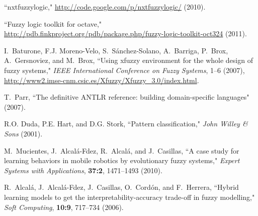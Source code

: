 \documentclass[11pt,twoside]{article}
\begin{document}
\begin{multicols}{2}
\begin{thebibliography}{10}
``nxtfuzzylogic," \url{http://code.google.com/p/nxtfuzzylogic/} (2010).

``Fuzzy logic toolkit for octave,"
\newblock
  \url{http://pdb.finkproject.org/pdb/package.php/fuzzy-logic-toolkit-oct324} (2011).

I.~Baturone, F.J. Moreno-Velo, S.~S\'anchez-Solano, A.~Barriga, P.~Brox,
  A.~Gersnoviez, and M.~Brox,
\newblock ``Using xfuzzy environment for the whole design of fuzzy systems," {\it IEEE International Conference on Fuzzy Systems}, 1--6 (2007), \url{http://www2.imse-cnm.csic.es/Xfuzzy/Xfuzzy_3.0/index.html}.

T.~Parr, ``The definitive ANTLR reference: building domain-specific languages" (2007).

{R.O.} Duda, {P.E.} Hart, and {D.G.} Stork,
\newblock ``Pattern classification," {\it John Willey \& Sons} (2001).

M.~Mucientes, J.~Alcal\'a-Fdez, R.~Alcal\'a, and J.~Casillas,
\newblock ``A case study for learning behaviors in mobile robotics by evolutionary fuzzy systems," {\it Expert Systems with Applications}, {\bf 37:2}, 1471--1493 (2010).

R.~Alcal{\'a}, J.~Alcal{\'a}-Fdez, J.~Casillas, O.~Cord{\'o}n, and F.~Herrera,
\newblock ``Hybrid learning models to get the interpretability-accuracy trade-off
  in fuzzy modelling," {\it Soft Computing}, {\bf 10:9}, 717--734 (2006).

\end{thebibliography}


\end{multicols}
\end{document}
